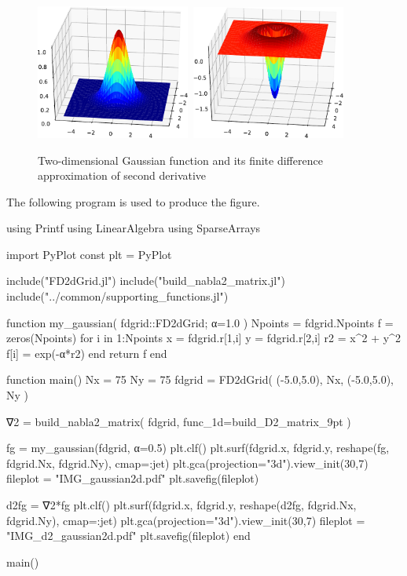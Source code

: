 \begin{figure}[H]
{\center
\includegraphics[width=0.45\textwidth]{../codes/FD2d/IMG_gaussian2d.pdf}\,%
\includegraphics[width=0.45\textwidth]{../codes/FD2d/IMG_d2_gaussian2d.pdf}
\par}
\caption{Two-dimensional Gaussian function and its finite difference
approximation of second derivative}
\label{fig:fd_gaussian_2d}
\end{figure}

The following program is used to produce the figure.
\begin{juliacode}
using Printf
using LinearAlgebra
using SparseArrays
    
import PyPlot
const plt = PyPlot
    
include("FD2dGrid.jl")
include("build_nabla2_matrix.jl")
include("../common/supporting_functions.jl")
    
function my_gaussian( fdgrid::FD2dGrid; α=1.0 )
  Npoints = fdgrid.Npoints
  f = zeros(Npoints)
  for i in 1:Npoints
    x = fdgrid.r[1,i]
    y = fdgrid.r[2,i]
    r2 = x^2 + y^2
    f[i] = exp(-α*r2)
  end
  return f
end
    
function main()  
  Nx = 75
  Ny = 75
  fdgrid = FD2dGrid( (-5.0,5.0), Nx, (-5.0,5.0), Ny )
    
  ∇2 = build_nabla2_matrix( fdgrid, func_1d=build_D2_matrix_9pt )
    
  fg = my_gaussian(fdgrid, α=0.5)
  plt.clf()
  plt.surf(fdgrid.x, fdgrid.y, reshape(fg, fdgrid.Nx, fdgrid.Ny), cmap=:jet)
  plt.gca(projection="3d").view_init(30,7)
  fileplot = "IMG_gaussian2d.pdf"
  plt.savefig(fileplot)
    
  d2fg = ∇2*fg    
  plt.clf()
  plt.surf(fdgrid.x, fdgrid.y, reshape(d2fg, fdgrid.Nx, fdgrid.Ny), cmap=:jet)
  plt.gca(projection="3d").view_init(30,7)    
  fileplot = "IMG_d2_gaussian2d.pdf"
  plt.savefig(fileplot)
end
    
main()    
\end{juliacode}


